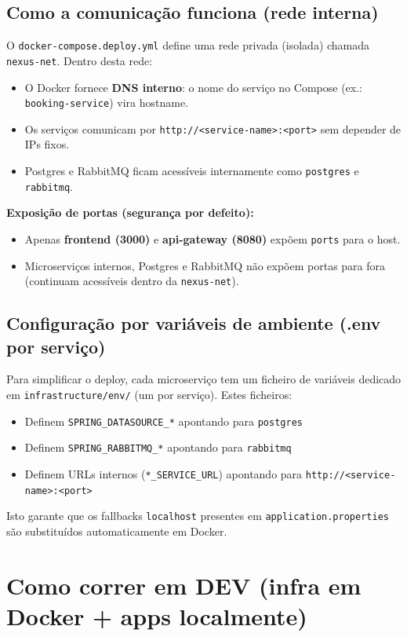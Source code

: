 \documentclass[11pt,a4paper]{article}
\begin{document}
\subsection{Como a comunicação funciona (rede interna)}
O \texttt{docker-compose.deploy.yml} define uma rede privada (isolada) chamada \texttt{nexus-net}. Dentro desta rede:
\begin{itemize}[nosep]
  \item O Docker fornece \textbf{DNS interno}: o nome do serviço no Compose (ex.: \texttt{booking-service}) vira hostname.
  \item Os serviços comunicam por \texttt{http://<service-name>:<port>} sem depender de IPs fixos.
  \item Postgres e RabbitMQ ficam acessíveis internamente como \texttt{postgres} e \texttt{rabbitmq}.
\end{itemize}

\textbf{Exposição de portas (segurança por defeito):}
\begin{itemize}[nosep]
  \item Apenas \textbf{frontend (3000)} e \textbf{api-gateway (8080)} expõem \texttt{ports} para o host.
  \item Microserviços internos, Postgres e RabbitMQ não expõem portas para fora (continuam acessíveis dentro da \texttt{nexus-net}).
\end{itemize}

\subsection{Configuração por variáveis de ambiente (.env por serviço)}
Para simplificar o deploy, cada microserviço tem um ficheiro de variáveis dedicado em \texttt{infrastructure/env/} (um por serviço). Estes ficheiros:
\begin{itemize}[nosep]
  \item Definem \texttt{SPRING\_DATASOURCE\_*} apontando para \texttt{postgres}
  \item Definem \texttt{SPRING\_RABBITMQ\_*} apontando para \texttt{rabbitmq}
  \item Definem URLs internos (\texttt{*\_SERVICE\_URL}) apontando para \texttt{http://<service-name>:<port>}
\end{itemize}

Isto garante que os fallbacks \texttt{localhost} presentes em \texttt{application.properties} são substituídos automaticamente em Docker.

\section{Como correr em DEV (infra em Docker + apps localmente)}
\end{document}
